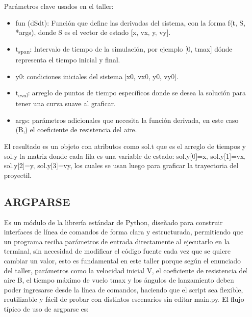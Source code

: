 \documentclass{article}
\begin{document}
Parámetros clave usados en el taller:
\begin{itemize}
\item fun (dSdt): Función que define las derivadas del sistema, con la forma f(t, S, *args), donde S es el vector de estado [x, vx, y, vy].
\item t\textsubscript{span}: Intervalo de tiempo de la simulación, por ejemplo [0, tmax] dónde representa el tiempo inicial y final.
\item y0: condiciones iniciales del sistema [x0, vx0, y0, vy0].
\item t\textsubscript{eval}: arreglo de puntos de tiempo específicos donde se desea la solución para tener una curva suave al graficar.
\item args: parámetros adicionales que necesita la función derivada, en este caso (B,) el coeficiente de resistencia del aire.
\end{itemize}

El resultado es un objeto con atributos como sol.t que es el arreglo de tiempos y sol.y la matriz donde cada fila es una variable de estado:
sol.y[0]=x, sol.y[1]=vx, sol.y[2]=y, sol.y[3]=vy, los cuales se usan luego para graficar la trayectoria del proyectil.
\subsection{ARGPARSE}
\label{sec:orge170275}
Es un módulo de la librería estándar de Python, diseñado para construir interfaces de línea de comandos de forma clara y estructurada, permitiendo que un programa reciba parámetros de entrada
directamente al ejecutarlo en la terminal, sin necesidad de modificar el código fuente cada vez que se quiere cambiar un valor, esto es fundamental en este taller porque
según el enunciado del taller, parámetros como la velocidad inicial V, el coeficiente de resistencia del aire B, el tiempo máximo de vuelo tmax y los ángulos de lanzamiento
deben poder ingresarse desde la línea de comandos, haciendo que el script sea flexible, reutilizable y fácil de probar con distintos escenarios sin editar main.py.
El flujo típico de uso de argparse es:
\end{document}
